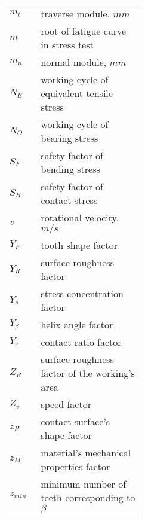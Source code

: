 \noindent\begin{tabular}[t]{p{0.05\linewidth}p{0.4\linewidth}}
	$ m_t $ & traverse module, $ \unit{mm} $\\
	$ m $ & root of fatigue curve in stress test\\
	$ m_n $ & normal module, $ \unit{mm} $\\
	$ N_{E} $ & working cycle of equivalent tensile stress\\
	$ N_{O} $ & working cycle of bearing stress\\
	$ S_F $ & safety factor of bending stress\\
	$ S_H $ & safety factor of contact stress\\
	$ v $ & rotational velocity, $ \unit{m/s} $\\
	$ Y_F $ & tooth shape factor\\
	$ Y_R $ & surface roughness factor\\
	$ Y_s $ & stress concentration factor\\
	$ Y_\beta $ & helix angle factor\\
	$ Y_\varepsilon $ & contact ratio factor\\
	$ Z_R $ & surface roughness factor of the working's area\\
	$ Z_v $ & speed factor\\
	$ z_H $ & contact surface's shape factor\\
	$ z_M $ & material's mechanical properties factor \\
	$ z_{min} $ & minimum number of teeth corresponding to $ \beta $\\
\end{tabular}
